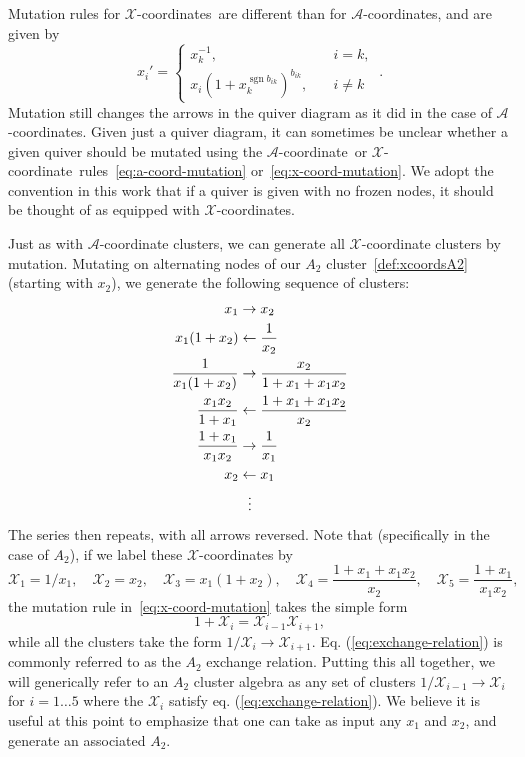 \documentclass[11pt]{article}
\DeclareMathOperator{\sgn}{sgn}
\def\nl{\nonumber\\}
\def\nn{\nonumber}
\def\x{\mathcal{X}}
\def\xcoord{$\mathcal{X}$-coordinate}
\def\xcoords{$\mathcal{X}$-coordinates}
\def\a{\mathcal{A}}
\def\acoord{$\mathcal{A}$-coordinate}
\def\acoords{$\mathcal{A}$-coordinates}
\begin{document}
Mutation rules for \xcoords\ are different than for \acoords, and are given by
\begin{equation}
  \label{eq:x-coord-mutation}
  x_{i}' =
  \begin{cases}
    x_{k}^{-1}, &\quad i=k,\\
    x_{i} (1+x_{k}^{\sgn b_{i k}})^{b_{i k}}, &\quad i \neq k
  \end{cases}\ .
\end{equation}
Mutation still changes the arrows in the quiver diagram as it did in the case of \acoords.  Given just a quiver diagram, it can sometimes be unclear whether a given quiver should be mutated using the \acoord\ or \xcoord\ rules~\eqref{eq:a-coord-mutation} or~\eqref{eq:x-coord-mutation}. We adopt the convention in this work that if a quiver is given with no frozen nodes, it should be thought of as equipped with \xcoords.

Just as with $\a$-coordinate clusters, we can generate all $\x$-coordinate clusters by mutation. Mutating on alternating nodes of our $A_2$ cluster~\eqref{def:xcoordsA2} (starting with $x_2$), we generate the following sequence of clusters:
\begin{align}
  x_1 &\to \color{black}{x_2} \nl
  \color{black}{x_1(1+x_2)} &\leftarrow \frac{1}{x_2} \nl
  \frac{1}{x_1(1+x_2)} &\to \color{black}{\frac{x_2}{1+x_1+x_1 x_2}} \\
  \color{black}{\frac{x_1 x_2}{1+x_1}} &\leftarrow \frac{1+x_1+x_1 x_2}{x_2} \nl
  \frac{1+x_1}{x_1 x_2} &\to \color{black}{\frac{1}{x_1}} \nl
  \color{black}{x_2} &\leftarrow x_1 \nl
  &\ \ \vdots \nn
\end{align}
The series then repeats, with all arrows reversed. Note that (specifically in the case of $A_2$), if we label these $\x$-coordinates by
\begin{equation}\label{def:a2-xcoords}
  \x_1 = 1/x_1, \quad \x_2 = x_2, \quad \x_3 = x_1(1+x_2), \quad 
  \x_4 = \frac{1+x_1+x_1 x_2}{x_2}, \quad \x_5 = \frac{1+x_1}{x_1 x_2},
\end{equation}
the mutation rule in~\eqref{eq:x-coord-mutation} takes the simple form
\begin{equation}\label{eq:exchange-relation}
  1+\x_i = \x_{i-1}\x_{i+1},
\end{equation}
while all the clusters take the form $1/\x_i \to \x_{i+1}$. Eq. (\ref{eq:exchange-relation}) is commonly referred to as the $A_2$ exchange relation. 
Putting this all together, we will generically refer to an $A_2$ cluster algebra as any set of clusters $1/\x_{i-1} \to \x_i$ for $i=1\ldots5$ where the $\x_i$ satisfy eq. (\ref{eq:exchange-relation}). We believe it is useful at this point to emphasize that one can take as input any $x_1$ and $x_2$, and generate an associated $A_2$. 
\end{document}
